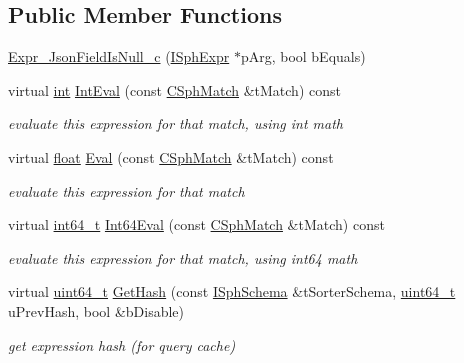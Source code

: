 \subsection*{Public Member Functions}
\begin{DoxyCompactItemize}
\item 
\hyperlink{structExpr__JsonFieldIsNull__c_abb91afedd3c12e87658528ce112f083f}{Expr\-\_\-\-Json\-Field\-Is\-Null\-\_\-c} (\hyperlink{structISphExpr}{I\-Sph\-Expr} $\ast$p\-Arg, bool b\-Equals)
\item 
virtual \hyperlink{sphinxexpr_8cpp_a4a26e8f9cb8b736e0c4cbf4d16de985e}{int} \hyperlink{structExpr__JsonFieldIsNull__c_a4ca50e5f2e4a01ae469e6c963a624bf5}{Int\-Eval} (const \hyperlink{classCSphMatch}{C\-Sph\-Match} \&t\-Match) const 
\begin{DoxyCompactList}\small\item\em evaluate this expression for that match, using int math \end{DoxyCompactList}\item 
virtual \hyperlink{sphinxexpr_8cpp_a0e0d0739f7035f18f949c2db2c6759ec}{float} \hyperlink{structExpr__JsonFieldIsNull__c_a3efeacc5b402f823b1597f71dd3d0aae}{Eval} (const \hyperlink{classCSphMatch}{C\-Sph\-Match} \&t\-Match) const 
\begin{DoxyCompactList}\small\item\em evaluate this expression for that match \end{DoxyCompactList}\item 
virtual \hyperlink{sphinxstd_8h_a996e72f71b11a5bb8b3b7b6936b1516d}{int64\-\_\-t} \hyperlink{structExpr__JsonFieldIsNull__c_a208901329ec3226efc4e2d1f5e51d53b}{Int64\-Eval} (const \hyperlink{classCSphMatch}{C\-Sph\-Match} \&t\-Match) const 
\begin{DoxyCompactList}\small\item\em evaluate this expression for that match, using int64 math \end{DoxyCompactList}\item 
virtual \hyperlink{sphinxstd_8h_aaa5d1cd013383c889537491c3cfd9aad}{uint64\-\_\-t} \hyperlink{structExpr__JsonFieldIsNull__c_a8519a7d4ff2f97919a4790af1a9cf074}{Get\-Hash} (const \hyperlink{classISphSchema}{I\-Sph\-Schema} \&t\-Sorter\-Schema, \hyperlink{sphinxstd_8h_aaa5d1cd013383c889537491c3cfd9aad}{uint64\-\_\-t} u\-Prev\-Hash, bool \&b\-Disable)
\begin{DoxyCompactList}\small\item\em get expression hash (for query cache) \end{DoxyCompactList}\end{DoxyCompactItemize}
